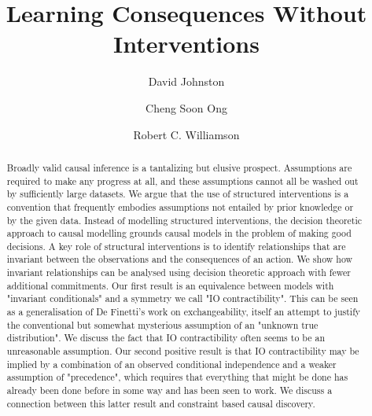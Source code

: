 \documentclass[USenglish,onecolumn]{article}
\begin{document}
 


  \author*[1]{David Johnston}

  \author[2]{Cheng Soon Ong}

  \author[3]{Robert C. Williamson}




  \title{\huge Learning Consequences Without Interventions}



  \begin{abstract}
{Broadly valid causal inference is a tantalizing but elusive prospect. Assumptions are required to make any progress at all, and these assumptions cannot all be washed out by sufficiently large datasets. We argue that the use of structured interventions is a convention that frequently embodies assumptions not entailed by prior knowledge or by the given data. Instead of modelling structured interventions, the decision theoretic approach to causal modelling grounds causal models in the problem of making good decisions. A key role of structural interventions is to identify relationships that are invariant between the observations and the consequences of an action. We show how invariant relationships can be analysed using decision theoretic approach with fewer additional commitments. Our first result is an equivalence between models with "invariant conditionals" and a symmetry we call "IO contractibility". This can be seen as a generalisation of De Finetti's work on exchangeability, itself an attempt to justify the conventional but somewhat mysterious assumption of an "unknown true distribution". We discuss the fact that IO contractibility often seems to be an unreasonable assumption. Our second positive result is that IO contractibility may be implied by a combination of an observed conditional independence and a weaker assumption of "precedence", which requires that everything that might be done has already been done before in some way and has been seen to work. We discuss a connection between this latter result and constraint based causal discovery.}
\end{abstract}
\end{document}
